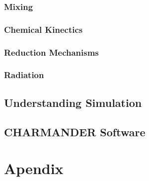 \documentclass[letterpaper, 10 pt]{report}
\begin{document}
\subsection{Mixing}
\subsection{Chemical Kinectics}
\subsection{Reduction Mechanisms}
\subsection{Radiation}
\newpage

\section{Understanding Simulation}

\newpage

\section{\textbf{CHARMANDER} Software}

\newpage


\newpage
\chapter{Apendix}

\end{document}
